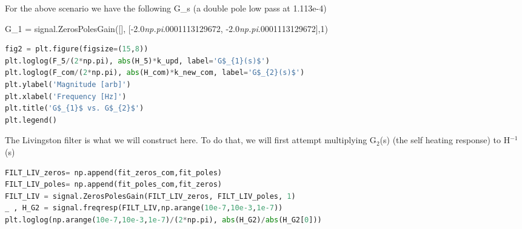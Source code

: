 \noindent For the above scenario we have the following G\_s (a double pole low pass at 1.113e-4)

\noindent G\_1 = signal.ZerosPolesGain({[}{]}, {[}-2.0\emph{np.pi}.0001113129672, -2.0\emph{np.pi}.0001113129672{]},1) 




\begin{spacing}{1.2} \begin{lstlisting}[frame=single,language=Python]
fig2 = plt.figure(figsize=(15,8))
plt.loglog(F_5/(2*np.pi), abs(H_5)*k_upd, label='G$_{1}(s)$')
plt.loglog(F_com/(2*np.pi), abs(H_com)*k_new_com, label='G$_{2}(s)$')
plt.ylabel('Magnitude [arb]')
plt.xlabel('Frequency [Hz]')
plt.title('G$_{1}$ vs. G$_{2}$')
plt.legend()
\end{lstlisting} \end{spacing}



\noindent The Livingston filter is what we will construct here. To do that, we will first attempt multiplying G\(_{2}\)(s) (the self heating response) to H\(^{-1}\)(s)

\begin{spacing}{1.2} \begin{lstlisting}[frame=single,language=Python]
FILT_LIV_zeros= np.append(fit_zeros_com,fit_poles)
FILT_LIV_poles= np.append(fit_poles_com,fit_zeros)
FILT_LIV = signal.ZerosPolesGain(FILT_LIV_zeros, FILT_LIV_poles, 1)
_ , H_G2 = signal.freqresp(FILT_LIV,np.arange(10e-7,10e-3,1e-7))
plt.loglog(np.arange(10e-7,10e-3,1e-7)/(2*np.pi), abs(H_G2)/abs(H_G2[0]))
\end{lstlisting} \end{spacing}

